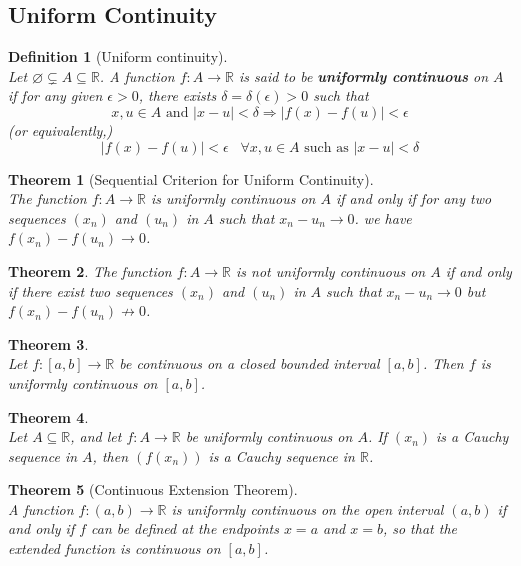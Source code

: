 \documentclass[12pt]{article}
\newtheorem{definition}{Definition}[section]
\newtheorem{theorem}{Theorem}[section]
\theoremstyle{definition}
\begin{document}
\subsection{Uniform Continuity}
\begin{definition}[Uniform continuity]
\hfill\\\normalfont Let $\varnothing\subsetneq A\subseteq \mathbb{R}$. A function $f:A\to \mathbb{R}$ is said to be \textbf{uniformly continuous} on $A$ if for any given $\epsilon>0$, there exists $\delta = \delta(\epsilon)>0$ such that
\[
x,u\in A\text{ and }|x-u|<\delta\Rightarrow |f(x)-f(u)|<\epsilon
\]
(or equivalently,)
\[
|f(x)-f(u)|<\epsilon \;\;\;\forall x,u\in A\text{ such as }|x-u|<\delta
\]
\end{definition}
\begin{theorem}[Sequential Criterion for Uniform Continuity]
\hfill\\\normalfont The function $f:A\to\mathbb{R}$ is uniformly continuous on $A$ if and only if for any two sequences $(x_n)$ and $(u_n)$ in $A$ such that $x_n-u_n\to 0$. we have $f(x_n)-f(u_n)\to 0$.
\end{theorem}
\begin{theorem}\normalfont The function $f:A\to\mathbb{R}$ is not uniformly continuous on $A$ if and only if there exist two sequences $(x_n)$ and $(u_n)$ in $A$ such that $x_n-u_n\to 0$ but $f(x_n)-f(u_n)\not\to 0$.
\end{theorem}
\begin{theorem}
\hfill\\\normalfont Let $f:[a,b]\to\mathbb{R}$ be continuous on a closed bounded interval $[a,b]$. Then $f$ is uniformly continuous on $[a,b]$.
\end{theorem}
\begin{theorem}
\hfill\\\normalfont Let $A\subseteq\mathbb{R}$, and let $f:A\to\mathbb{R}$ be uniformly continuous on $A$. If $(x_n)$ is a Cauchy sequence in $A$, then $(f(x_n))$ is a Cauchy sequence in $\mathbb{R}$.
\end{theorem}
\begin{theorem}[Continuous Extension Theorem]
\hfill\\\normalfont A function $f:(a,b)\to\mathbb{R}$ is uniformly continuous on the open interval $(a,b)$ if and only if $f$ can be defined at the endpoints $x=a$ and $x=b$, so that the extended function is continuous on $[a,b]$.
\end{theorem}
\end{document}
